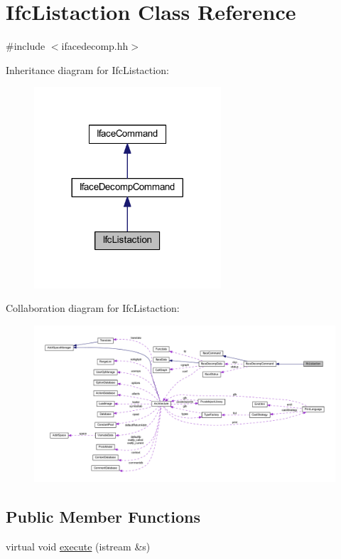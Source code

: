 \hypertarget{class_ifc_listaction}{}\section{Ifc\+Listaction Class Reference}
\label{class_ifc_listaction}


{\ttfamily \#include $<$ifacedecomp.\+hh$>$}



Inheritance diagram for Ifc\+Listaction\+:
\nopagebreak
\begin{figure}[H]
\begin{center}
\leavevmode
\includegraphics[width=197pt]{class_ifc_listaction__inherit__graph}
\end{center}
\end{figure}


Collaboration diagram for Ifc\+Listaction\+:
\nopagebreak
\begin{figure}[H]
\begin{center}
\leavevmode
\includegraphics[width=350pt]{class_ifc_listaction__coll__graph}
\end{center}
\end{figure}
\subsection*{Public Member Functions}
\begin{DoxyCompactItemize}
\item 
virtual void \mbox{\hyperlink{class_ifc_listaction_a4513740c2b18e325cbf9c5382a715d08}{execute}} (istream \&s)
\end{DoxyCompactItemize}
